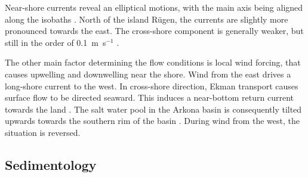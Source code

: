Near-shore currents reveal an elliptical motions, with the main axis 
being aligned along the isobaths \citep[][]{lass2003}. North of the island 
R\"{u}gen, the currents are slightly more pronounced towards the east. The 
cross-shore component is generally weaker, but still in the order of 
0.1~m~s$^{-1}$ \citep[][]{lass1993}. 

The other main factor determining the flow conditions is local wind forcing, 
that causes upwelling and downwelling near the shore. Wind from the east drives 
a long-shore current to the west. In cross-shore direction, Ekman 
transport causes surface flow to be directed seaward. This induces a 
near-bottom return current towards the land \citep[][]{lass1993}. The salt 
water pool in the Arkona basin is consequently tilted upwards towards the 
southern rim of the basin \citep[][]{lass2003}. During wind from the west, the 
situation is reversed. 

 \FloatBarrier
\subsection{Sedimentology}

